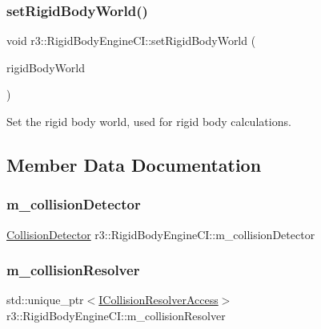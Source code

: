 \subsubsection{\texorpdfstring{set\+Rigid\+Body\+World()}{setRigidBodyWorld()}}
{\footnotesize\ttfamily void r3\+::\+Rigid\+Body\+Engine\+C\+I\+::set\+Rigid\+Body\+World (\begin{DoxyParamCaption}\item[{\mbox{\hyperlink{classr3_1_1_rigid_body_world}{Rigid\+Body\+World}} $\ast$}]{rigid\+Body\+World }\end{DoxyParamCaption})}

Set the rigid body world, used for rigid body calculations. 

\subsection{Member Data Documentation}
\mbox{\label{classr3_1_1_rigid_body_engine_c_i_adb37ed2c686594f9504680be76c2dcbc}} 
\subsubsection{\texorpdfstring{m\+\_\+collision\+Detector}{m\_collisionDetector}}
{\footnotesize\ttfamily \mbox{\hyperlink{classr3_1_1_collision_detector}{Collision\+Detector}} r3\+::\+Rigid\+Body\+Engine\+C\+I\+::m\+\_\+collision\+Detector\hspace{0.3cm}{\ttfamily [protected]}}

\mbox{\label{classr3_1_1_rigid_body_engine_c_i_a27f09a82ab77919c2fb78869f6d3c035}} 
\subsubsection{\texorpdfstring{m\+\_\+collision\+Resolver}{m\_collisionResolver}}
{\footnotesize\ttfamily std\+::unique\+\_\+ptr$<$\mbox{\hyperlink{classr3_1_1_i_collision_resolver_access}{I\+Collision\+Resolver\+Access}}$>$ r3\+::\+Rigid\+Body\+Engine\+C\+I\+::m\+\_\+collision\+Resolver\hspace{0.3cm}{\ttfamily [protected]}}


